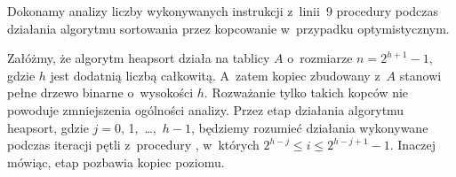 \exercise %
Dokonamy analizy liczby wykonywanych instrukcji z~linii~9 procedury  podczas działania algorytmu sortowania przez kopcowanie w~przypadku optymistycznym.

Załóżmy, że algorytm heapsort działa na tablicy $A$ o~rozmiarze $n=2^{h+1}-1$, gdzie $h$ jest dodatnią liczbą całkowitą.
A~zatem kopiec zbudowany z~$A$ stanowi pełne drzewo binarne o~wysokości $h$.
Rozważanie tylko takich kopców nie powoduje zmniejszenia ogólności analizy.
Przez  etap działania algorytmu heapsort, gdzie $j=0$, 1,~\dots,~$h-1$, będziemy rozumieć działania wykonywane podczas iteracji pętli  z~procedury , w~których $2^{h-j}\le i\le2^{h-j+1}-1$.
Inaczej mówiąc,  etap pozbawia kopiec  poziomu.


